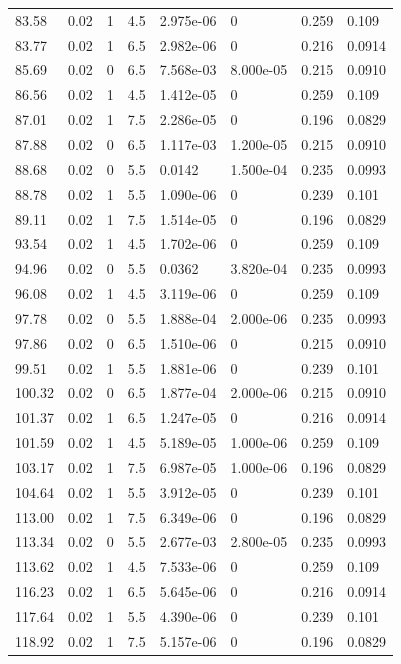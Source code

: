 \documentclass[preview]{standalone}
\begin{document}
{{{\begin{tabular}{L{1.2cm}C{1.2cm} C{0.3cm}C{0.5cm} C{1.4cm}C{1.4cm} C{1.4cm}C{1.4cm}}
  83.58  &  0.02  & 1     & 4.5 &  2.975e-06  & 0  & 0.259 &  0.109   \\ 
  83.77  &  0.02  & 1     & 6.5 &  2.982e-06  & 0  & 0.216 &  0.0914   \\ 
  85.69  &  0.02  & 0     & 6.5 &  7.568e-03  & 8.000e-05  & 0.215 &  0.0910   \\ 
  86.56  &  0.02  & 1     & 4.5 &  1.412e-05  & 0  & 0.259 &  0.109   \\ 
  87.01  &  0.02  & 1     & 7.5 &  2.286e-05  & 0  & 0.196 &  0.0829   \\ 
  87.88  &  0.02  & 0     & 6.5 &  1.117e-03  & 1.200e-05  & 0.215 &  0.0910   \\ 
  88.68  &  0.02  & 0     & 5.5 &  0.0142  & 1.500e-04  & 0.235 &  0.0993   \\ 
  88.78  &  0.02  & 1     & 5.5 &  1.090e-06  & 0  & 0.239 &  0.101   \\ 
  89.11  &  0.02  & 1     & 7.5 &  1.514e-05  & 0  & 0.196 &  0.0829   \\ 
  93.54  &  0.02  & 1     & 4.5 &  1.702e-06  & 0  & 0.259 &  0.109   \\ 
  94.96  &  0.02  & 0     & 5.5 &  0.0362  & 3.820e-04  & 0.235 &  0.0993   \\ 
  96.08  &  0.02  & 1     & 4.5 &  3.119e-06  & 0  & 0.259 &  0.109   \\ 
  97.78  &  0.02  & 0     & 5.5 &  1.888e-04  & 2.000e-06  & 0.235 &  0.0993   \\ 
  97.86  &  0.02  & 0     & 6.5 &  1.510e-06  & 0  & 0.215 &  0.0910   \\ 
  99.51  &  0.02  & 1     & 5.5 &  1.881e-06  & 0  & 0.239 &  0.101   \\ 
  100.32  &  0.02  & 0     & 6.5 &  1.877e-04  & 2.000e-06  & 0.215 &  0.0910   \\ 
  101.37  &  0.02  & 1     & 6.5 &  1.247e-05  & 0  & 0.216 &  0.0914   \\ 
  101.59  &  0.02  & 1     & 4.5 &  5.189e-05  & 1.000e-06  & 0.259 &  0.109   \\ 
  103.17  &  0.02  & 1     & 7.5 &  6.987e-05  & 1.000e-06  & 0.196 &  0.0829   \\ 
  104.64  &  0.02  & 1     & 5.5 &  3.912e-05  & 0  & 0.239 &  0.101   \\ 
  113.00  &  0.02  & 1     & 7.5 &  6.349e-06  & 0  & 0.196 &  0.0829   \\ 
  113.34  &  0.02  & 0     & 5.5 &  2.677e-03  & 2.800e-05  & 0.235 &  0.0993   \\ 
  113.62  &  0.02  & 1     & 4.5 &  7.533e-06  & 0  & 0.259 &  0.109   \\ 
  116.23  &  0.02  & 1     & 6.5 &  5.645e-06  & 0  & 0.216 &  0.0914   \\ 
  117.64  &  0.02  & 1     & 5.5 &  4.390e-06  & 0  & 0.239 &  0.101   \\ 
  118.92  &  0.02  & 1     & 7.5 &  5.157e-06  & 0  & 0.196 &  0.0829   \\ 
\hline 
\end{tabular} 

}}}
\end{document}
